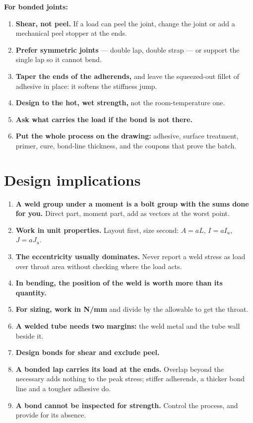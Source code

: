 \documentclass[11pt,a4paper]{article}
\begin{document}
\textbf{For bonded joints:}
\begin{enumerate}[leftmargin=*,itemsep=2pt,resume]
\item \textbf{Shear, not peel.} If a load can peel the joint, change the joint or add a mechanical
  peel stopper at the ends.
\item \textbf{Prefer symmetric joints} --- double lap, double strap --- or support the single lap so
  it cannot bend.
\item \textbf{Taper the ends of the adherends,} and leave the squeezed-out fillet of adhesive in
  place: it softens the stiffness jump.
\item \textbf{Design to the hot, wet strength,} not the room-temperature one.
\item \textbf{Ask what carries the load if the bond is not there.}
\item \textbf{Put the whole process on the drawing:} adhesive, surface treatment, primer, cure,
  bond-line thickness, and the coupons that prove the batch.
\end{enumerate}

\section{Design implications}

\begin{enumerate}[leftmargin=*,itemsep=3pt]
\item \textbf{A weld group under a moment is a bolt group with the sums done for you.} Direct part,
  moment part, add as vectors at the worst point.
\item \textbf{Work in unit properties.} Layout first, size second: $A=aL$, $I=aI_u$, $J=aJ_u$.
\item \textbf{The eccentricity usually dominates.} Never report a weld stress as load over throat
  area without checking where the load acts.
\item \textbf{In bending, the position of the weld is worth more than its quantity.}
\item \textbf{For sizing, work in N/mm} and divide by the allowable to get the throat.
\item \textbf{A welded tube needs two margins:} the weld metal and the tube wall beside it.
\item \textbf{Design bonds for shear and exclude peel.}
\item \textbf{A bonded lap carries its load at the ends.} Overlap beyond the necessary adds nothing
  to the peak stress; stiffer adherends, a thicker bond line and a tougher adhesive do.
\item \textbf{A bond cannot be inspected for strength.} Control the process, and provide for its
  absence.
\end{enumerate}
\end{document}
